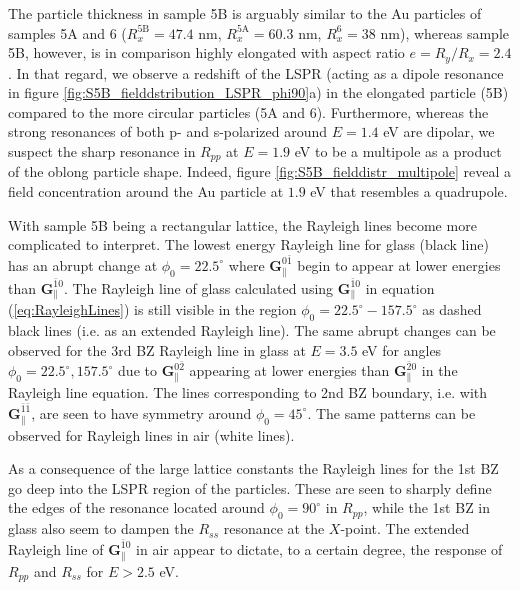 The particle thickness in sample 5B is arguably similar to the Au particles of samples 5A and 6 ($R_x^\text{5B}=47.4$ nm, $R_x^\text{5A}=60.3$ nm, $R_x^\text{6}=38$ nm), whereas sample 5B, however, is in comparison highly elongated with aspect ratio $e=R_y/R_x=2.4$. In that regard, we observe a redshift of the LSPR (acting as a dipole resonance in figure \ref{fig:S5B_fielddstribution_LSPR_phi90}a) in the elongated particle (5B) compared to the more circular particles (5A and 6)\cite{multipolePlasmons_metalrods}. Furthermore, whereas the strong resonances of both p- and s-polarized around $E=1.4$ eV are dipolar, we suspect the sharp resonance in $R_{pp}$ at $E=1.9$ eV to be a multipole as a product of the oblong particle shape\cite{multipolePlasmons_metalrods}. Indeed, figure \ref{fig:S5B_fielddistr_multipole} reveal a field concentration around the Au particle at $1.9$ eV that resembles a quadrupole.


With sample 5B being a rectangular lattice, the Rayleigh lines become more complicated to interpret. The lowest energy Rayleigh line for glass (black line) has an abrupt change at $\phi_0=22.5^\circ$ where $\mathbf{G}_\parallel^{0\bar{1}}$ begin to appear at lower energies than $\mathbf{G}_\parallel^{\bar{1}0}$. The Rayleigh line of glass calculated using $\mathbf{G}_\parallel^{\bar{1}0}$ in equation (\ref{eq:RayleighLines}) is still visible in the region $\phi_0=22.5^\circ-157.5^\circ$ as dashed black lines (i.e. as an extended Rayleigh line). The same abrupt changes can be observed for the 3rd BZ Rayleigh line in glass at $E=3.5$ eV for angles $\phi_0=22.5^\circ, 157.5^\circ$ due to $\mathbf{G}_\parallel^{0\bar{2}}$ appearing at lower energies than $\mathbf{G}_\parallel^{\bar{2}0}$ in the Rayleigh line equation. The lines corresponding to 2nd BZ boundary, i.e. with $\mathbf{G}_\parallel^{\bar{1}\bar{1}}$, are seen to have symmetry around $\phi_0=45^\circ$. The same patterns can be observed for Rayleigh lines in air (white lines).

As a consequence of the large lattice constants the Rayleigh lines for the 1st BZ go deep into the LSPR region of the particles. These are seen to sharply define the edges of the resonance located around $\phi_0=90^\circ$ in $R_{pp}$, while the 1st BZ in glass also seem to dampen the $R_{ss}$ resonance at the $X$-point. The extended Rayleigh line of $\mathbf{G}_\parallel^{\bar{1}0}$ in air appear to dictate, to a certain degree, the response of  $R_{pp}$ and $R_{ss}$ for $E>2.5$ eV.


